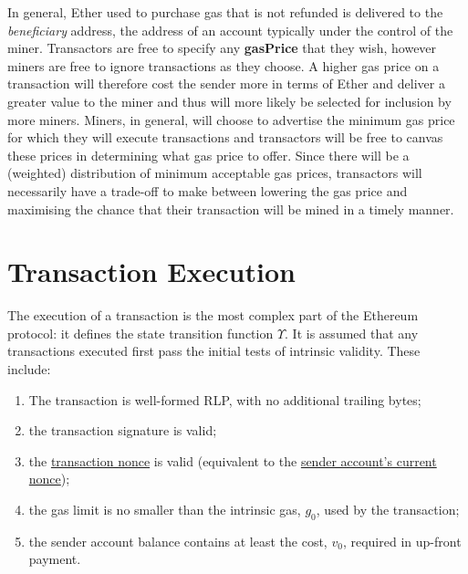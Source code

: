 \documentclass[9pt,oneside]{amsart}
\begin{document}
\begin{multicols}{2}
In general, Ether used to purchase gas that is not refunded is delivered to the \textit{beneficiary} address, the address of an account typically under the control of the miner. Transactors are free to specify any \textbf{gasPrice} that they wish, however miners are free to ignore transactions as they choose. A higher gas price on a transaction will therefore cost the sender more in terms of Ether and deliver a greater value to the miner and thus will more likely be selected for inclusion by more miners. Miners, in general, will choose to advertise the minimum gas price for which they will execute transactions and transactors will be free to canvas these prices in determining what gas price to offer. Since there will be a (weighted) distribution of minimum acceptable gas prices, transactors will necessarily have a trade-off to make between lowering the gas price and maximising the chance that their transaction will be mined in a timely manner.


\section{Transaction Execution} \label{ch:transactions}

The execution of a transaction is the most complex part of the Ethereum protocol: it defines the state transition function \hyperlink{Upsilon_state_transition}{$\Upsilon$}. It is assumed that any transactions executed first pass the initial tests of intrinsic validity. These include:

\begin{enumerate}
\item The transaction is well-formed RLP, with no additional trailing bytes;
\item the transaction signature is valid;
\item the \hyperlink{transaction_nonce}{transaction nonce} is valid (equivalent to the \hyperlink{account_nonce}{sender account's current nonce});
\item the gas limit is no smaller than the intrinsic gas, $g_0$, used by the transaction;
\item the sender account balance contains at least the cost, $v_0$, required in up-front payment.
\end{enumerate}


\end{multicols}
\end{document}
